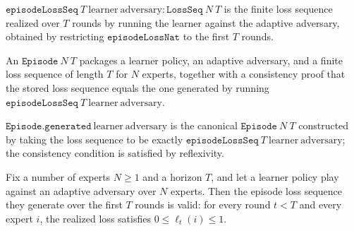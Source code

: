 \begin{definition}
\label{episodeLossSeq}
\leanok
{}
$\texttt{episodeLossSeq}\ T\ \mathrm{learner}\ \mathrm{adversary} : \texttt{LossSeq}\ N\ T$
is the finite loss sequence realized over $T$ rounds by running the learner
against the adaptive adversary, obtained by restricting $\texttt{episodeLossNat}$
to the first $T$ rounds.
\end{definition}

\begin{definition}[Episode]
\label{Episode}
\leanok
{}
An $\texttt{Episode}\ N\ T$ packages a learner policy, an adaptive adversary, and
a finite loss sequence of length $T$ for $N$ experts, together with a consistency
proof that the stored loss sequence equals the one generated by running
$\texttt{episodeLossSeq}\ T\ \mathrm{learner}\ \mathrm{adversary}$.
\end{definition}

\begin{definition}
\label{Episode.generated}
\leanok
{}
$\texttt{Episode.generated}\ \mathrm{learner}\ \mathrm{adversary}$ is the canonical
$\texttt{Episode}\ N\ T$ constructed by taking the loss sequence to be exactly
$\texttt{episodeLossSeq}\ T\ \mathrm{learner}\ \mathrm{adversary}$; the consistency
condition is satisfied by reflexivity.
\end{definition}

\begin{theorem}
\label{episodeLossSeq_valid}
\leanok
{}
Fix a number of experts $N \ge 1$ and a horizon $T$, and let a learner policy play
against an adaptive adversary over $N$ experts. Then the episode loss sequence they
generate over the first $T$ rounds is valid: for every round $t < T$ and every expert
$i$, the realized loss satisfies $0 \le \ell_t(i) \le 1$.
\end{theorem}

